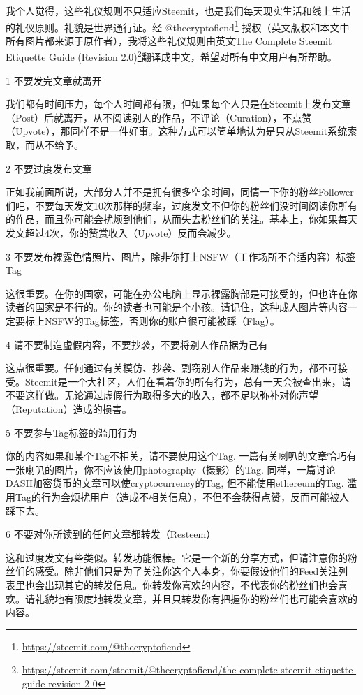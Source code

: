 \documentclass[]{ctexbook}
\renewcommand{\href}[2]{#2\footnote{\url{#1}}}
\begin{document}
我个人觉得，这些礼仪规则不只适应Steemit，也是我们每天现实生活和线上生活的礼仪原则。礼貌是世界通行证。经 \href{https://steemit.com/@thecryptofiend}{@thecryptofiend} 授权（英文版权和本文中所有图片都来源于原作者），我将这些礼仪规则由\href{https://steemit.com/steemit/@thecryptofiend/the-complete-steemit-etiquette-guide-revision-2-0}{英文The Complete Steemit Etiquette Guide (Revision 2.0)}翻译成中文，希望对所有中文用户有所帮助。

1 不要发完文章就离开

我们都有时间压力，每个人时间都有限，但如果每个人只是在Steemit上发布文章（Post）后就离开，从不阅读别人的作品，不评论（Curation），不点赞（Upvote），那同样不是一件好事。这种方式可以简单地认为是只从Steemit系统索取，而从不给予。

2 不要过度发布文章

正如我前面所说，大部分人并不是拥有很多空余时间，同情一下你的粉丝Follower们吧，不要每天发文10次那样的频率，过度发文不但你的粉丝们没时间阅读你所有的作品，而且你可能会扰烦到他们，从而失去粉丝们的关注。基本上，你如果每天发文超过4次，你的赞赏收入（Upvote）反而会减少。

3 不要发布裸露色情照片、图片，除非你打上NSFW（工作场所不合适内容）标签Tag

这很重要。在你的国家，可能在办公电脑上显示裸露胸部是可接受的，但也许在你读者的国家是不行的。你的读者也可能是个小孩。请记住，这种成人图片等内容一定要标上NSFW的Tag标签，否则你的账户很可能被踩（Flag）。

4 请不要制造虚假内容，不要抄袭，不要将别人作品据为己有

这点很重要。任何通过有关模仿、抄袭、剽窃别人作品来赚钱的行为，都不可接受。Steemit是一个大社区，人们在看着你的所有行为，总有一天会被查出来，请不要这样做。无论通过虚假行为取得多大的收入，都不足以弥补对你声望（Reputation）造成的损害。

5 不要参与Tag标签的滥用行为

你的内容如果和某个Tag不相关，请不要使用这个Tag. 一篇有关喇叭的文章恰巧有一张喇叭的图片，你不应该使用photography（摄影）的Tag. 同样，一篇讨论DASH加密货币的文章可以使cryptocurrency的Tag, 但不能使用ethereum的Tag. 滥用Tag的行为会烦扰用户（造成不相关信息），不但不会获得点赞，反而可能被人踩下去。

6 不要对你所读到的任何文章都转发（Resteem）

这和过度发文有些类似。转发功能很棒。它是一个新的分享方式，但请注意你的粉丝们的感受。除非他们只是为了关注你这个人本身，你要假设他们的Feed关注列表里也会出现其它的转发信息。你转发你喜欢的内容，不代表你的粉丝们也会喜欢。请礼貌地有限度地转发文章，并且只转发你有把握你的粉丝们也可能会喜欢的内容。
\end{document}
